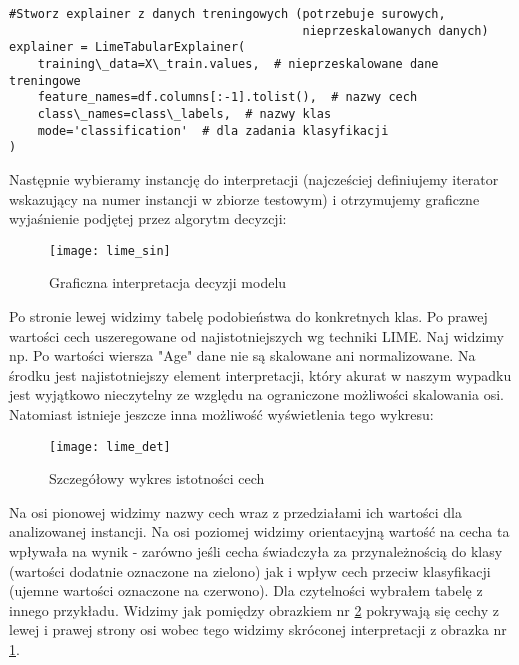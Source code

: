 \begin{lstlisting}[caption=Definicja explainera]
#Stworz explainer z danych treningowych (potrzebuje surowych, 
                                         nieprzeskalowanych danych)
explainer = LimeTabularExplainer(
    training\_data=X\_train.values,  # nieprzeskalowane dane treningowe
    feature_names=df.columns[:-1].tolist(),  # nazwy cech
    class\_names=class\_labels,  # nazwy klas
    mode='classification'  # dla zadania klasyfikacji
)
\end{lstlisting}

Następnie wybieramy instancję do interpretacji (najcześciej definiujemy iterator wskazujący na numer instancji w zbiorze testowym) i otrzymujemy graficzne wyjaśnienie podjętej przez algorytm decyzcji:\\

\begin{figure}[H]
    \centering
    \texttt{[image: lime\_sin]}
    \caption{Graficzna interpretacja decyzji modelu}
    \label{fig:lime_sin}
\end{figure}

Po stronie lewej widzimy tabelę podobieństwa do konkretnych klas. Po prawej wartości cech uszeregowane od najistotniejszych wg techniki LIME. Naj widzimy np. Po wartości wiersza "Age" dane nie są skalowane ani normalizowane. Na środku jest najistotniejszy element interpretacji, który akurat w naszym wypadku jest wyjątkowo nieczytelny ze względu na ograniczone możliwości skalowania osi. Natomiast istnieje jeszcze inna możliwość wyświetlenia tego wykresu:\\

\begin{figure}[H]
    \centering
    \texttt{[image: lime\_det]}
    \caption{Szczegółowy wykres istotności cech}
    \label{fig:lime_det}
\end{figure}

Na osi pionowej widzimy nazwy cech wraz z przedziałami ich wartości dla analizowanej instancji. Na osi poziomej widzimy orientacyjną wartość na cecha ta wpływała na wynik - zarówno jeśli cecha świadczyła za przynależnością do klasy (wartości dodatnie oznaczone na zielono) jak i wpływ cech przeciw klasyfikacji (ujemne wartości oznaczone na czerwono). Dla czytelności wybrałem tabelę z innego przykładu. Widzimy jak pomiędzy obrazkiem nr \ref{fig:lime_det} pokrywają się cechy z lewej i prawej strony osi wobec tego widzimy skróconej interpretacji z obrazka nr \ref{fig:lime_sin}.